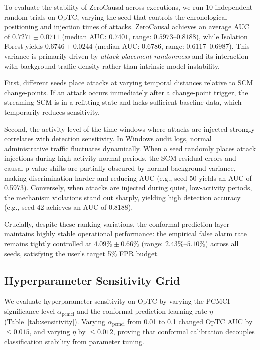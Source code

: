 To evaluate the stability of ZeroCausal across executions, we run 10 independent random trials on OpTC, varying the seed that controls the chronological positioning and injection times of attacks. ZeroCausal achieves an average AUC of $0.7271 \pm 0.0711$ (median AUC: $0.7401$, range: $0.5973$--$0.8188$), while Isolation Forest yields $0.6746 \pm 0.0244$ (median AUC: $0.6786$, range: $0.6117$--$0.6987$). This variance is primarily driven by \textit{attack placement randomness} and its interaction with background traffic density rather than intrinsic model instability. 

First, different seeds place attacks at varying temporal distances relative to SCM change-points. If an attack occurs immediately after a change-point trigger, the streaming SCM is in a refitting state and lacks sufficient baseline data, which temporarily reduces sensitivity. 

Second, the activity level of the time windows where attacks are injected strongly correlates with detection sensitivity. In Windows audit logs, normal administrative traffic fluctuates dynamically. When a seed randomly places attack injections during high-activity normal periods, the SCM residual errors and causal p-value shifts are partially obscured by normal background variance, making discrimination harder and reducing AUC (e.g., seed 50 yields an AUC of 0.5973). Conversely, when attacks are injected during quiet, low-activity periods, the mechanism violations stand out sharply, yielding high detection accuracy (e.g., seed 42 achieves an AUC of 0.8188). 

Crucially, despite these ranking variations, the conformal prediction layer maintains highly stable operational performance: the empirical false alarm rate remains tightly controlled at $4.09\% \pm 0.66\%$ (range: $2.43\%$--$5.10\%$) across all seeds, satisfying the user's target 5\% FPR budget.

\subsection{Hyperparameter Sensitivity Grid}
\label{sec:sensitivity}
We evaluate hyperparameter sensitivity on OpTC by varying the PCMCI significance level $\alpha_{\text{pcmci}}$ and the conformal prediction learning rate $\eta$ (Table~\ref{tab:sensitivity}). Varying $\alpha_{\text{pcmci}}$ from 0.01 to 0.1 changed OpTC AUC by $\le 0.015$, and varying $\eta$ by $\le 0.012$, proving that conformal calibration decouples classification stability from parameter tuning.

